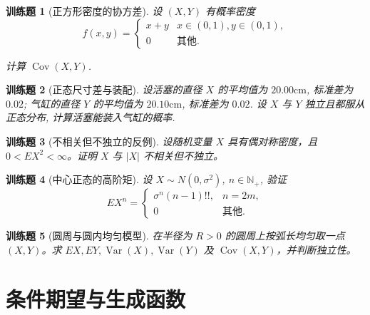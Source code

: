 \documentclass[UTF8,12pt,a4paper,fontset=fandol]{ctexbook}
\newtheorem{exercise}{训练题}[section]
\begin{document}
\begin{exercise}[正方形密度的协方差]\label{q:A5.28}
设 $(X,Y)$ 有概率密度
    \[f(x,y)=\begin{cases}
        x+y & x\in(0,1),y\in(0,1), \\
        0 & \text{其他}.
    \end{cases}\]

    计算 $\operatorname{Cov}(X,Y)$.\par{}\end{exercise}

\begin{exercise}[正态尺寸差与装配]\label{q:A5.30}
设活塞的直径 $X$ 的平均值为 $20.00\text{cm}$, 标准差为 $0.02$; 气缸的直径 $Y$ 的平均值为 $20.10\text{cm}$, 标准差为 $0.02$. 设 $X$ 与 $Y$ 独立且都服从 正态分布, 计算活塞能装入气缸的概率.\par{}\end{exercise}

\begin{exercise}[不相关但不独立的反例]\label{q:A5.32}
设随机变量 $X$ 具有偶对称密度，且 $0<EX^2<\infty$。证明 $X$ 与 $|X|$ 不相关但不独立。\par{}\end{exercise}

\begin{exercise}[中心正态的高阶矩]\label{q:A5.33}
设 $X\sim N(0,\sigma^2)$, $n\in\mathbb{N}_+$, 验证
    \[EX^n=\begin{cases}
        \sigma^n(n-1)!!, & n=2m, \\
        0 & \text{其他}.
    \end{cases}\]\par{}\end{exercise}

\begin{exercise}[圆周与圆内均匀模型]\label{q:A5.35}
在半径为 $R>0$ 的圆周上按弧长均匀取一点 $(X,Y)$。求 $EX,EY,\operatorname{Var}(X),\operatorname{Var}(Y)$ 及 $\operatorname{Cov}(X,Y)$，并判断独立性。\par{}\end{exercise}

\clearpage\section{条件期望与生成函数}
\end{document}
